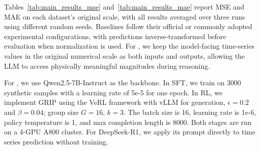 
Tables~\ref{tab:main_results_mse} and~\ref{tab:main_results_mae} report MSE and MAE on each dataset's original scale, with all results averaged over three runs using different random seeds. Baselines follow their official or commonly adopted experimental configurations, with predictions inverse-transformed before evaluation when normalization is used. For \Ours, we keep the model-facing time-series values in the original numerical scale as both inputs and outputs, allowing the LLM to access physically meaningful magnitudes during reasoning.

For \Ours, we use Qwen2.5-7B-Instruct as the backbone. In SFT, we train on 3000 synthetic samples with a learning rate of 5e-5 for one epoch. In RL, we implement GRIP using the VeRL framework \citep{verl} with vLLM for generation, $\epsilon=0.2$ and $\beta=0.04$; group size $G=16$, $k=3$. The batch size is 16, learning rate is 1e-6, policy temperature is 1, and max completion length is 8000. Both stages are run on a 4-GPU A800 cluster. For DeepSeek-R1, we apply its prompt directly to time series prediction without training. 





